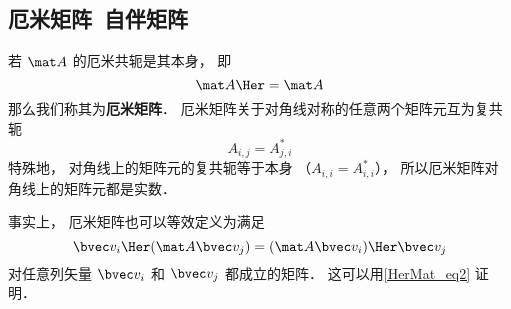 \subsection{厄米矩阵\ 自伴矩阵}
若 $\mat A$ 的厄米共轭是其本身， 即
\begin{equation}
\mat A\Her = \mat A
\end{equation}
那么我们称其为\textbf{厄米矩阵}． 厄米矩阵关于对角线对称的任意两个矩阵元互为复共轭
\begin{equation}
A_{i,j} = A_{j,i}^*
\end{equation}
特殊地， 对角线上的矩阵元的复共轭等于本身 （$A_{i,i} = A_{i,i}^*$）， 所以厄米矩阵对角线上的矩阵元都是实数．

事实上， 厄米矩阵也可以等效定义为满足
\begin{equation}
\bvec v_i\Her (\mat A \bvec v_j) = (\mat A \bvec v_i)\Her \bvec v_j
\end{equation}
对任意列矢量 $\bvec v_i$ 和 $\bvec v_j$ 都成立的矩阵． 这可以用\autoref{HerMat_eq2} 证明．